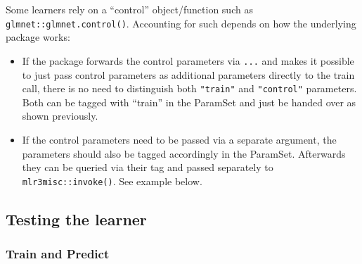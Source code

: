 \documentclass[]{scrbook}
\newenvironment{Shaded}{\begin{snugshade}}{\end{snugshade}}
\newcommand{\ControlFlowTok}[1]{\textcolor[rgb]{0.13,0.29,0.53}{\textbf{#1}}}
\newcommand{\DataTypeTok}[1]{\textcolor[rgb]{0.13,0.29,0.53}{#1}}
\newcommand{\ErrorTok}[1]{\textcolor[rgb]{0.64,0.00,0.00}{\textbf{#1}}}
\newcommand{\KeywordTok}[1]{\textcolor[rgb]{0.13,0.29,0.53}{\textbf{#1}}}
\newcommand{\NormalTok}[1]{#1}
\newcommand{\OperatorTok}[1]{\textcolor[rgb]{0.81,0.36,0.00}{\textbf{#1}}}
\newcommand{\StringTok}[1]{\textcolor[rgb]{0.31,0.60,0.02}{#1}}
\providecommand{\tightlist}{%
  \setlength{\itemsep}{0pt}\setlength{\parskip}{0pt}}
\renewenvironment{Shaded} {\begin{snugshade}\small} {\end{snugshade}}
\begin{document}
Some learners rely on a ``control'' object/function such as \texttt{glmnet::glmnet.control()}.
Accounting for such depends on how the underlying package works:

\begin{itemize}
\tightlist
\item
  If the package forwards the control parameters via \texttt{...} and makes it possible to just pass control parameters as additional parameters directly to the train call, there is no need to distinguish both \texttt{"train"} and \texttt{"control"} parameters.
  Both can be tagged with ``train'' in the ParamSet and just be handed over as shown previously.
\item
  If the control parameters need to be passed via a separate argument, the parameters should also be tagged accordingly in the ParamSet.
  Afterwards they can be queried via their tag and passed separately to \texttt{mlr3misc::invoke()}.
  See example below.
\end{itemize}

\begin{Shaded}
\end{Shaded}

\hypertarget{learner-test}{%
\subsection{Testing the learner}\label{learner-test}}

\hypertarget{train-and-predict}{%
\subsubsection{Train and Predict}\label{train-and-predict}}
\end{document}
